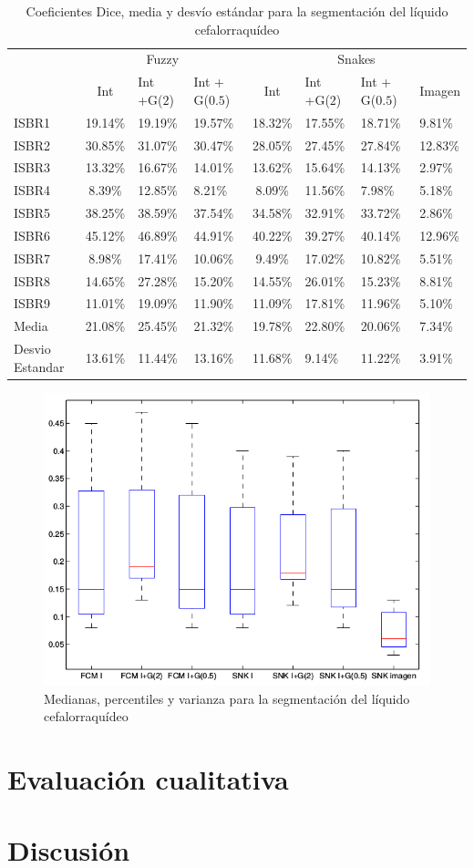 \begin{table}[h]
	\centering
	\begin{tabular}{l|cll|clll}
		& \multicolumn{3}{c|}{Fuzzy} & \multicolumn{4}{c}{Snakes} \\ \cline{2-8} 
		& Int & Int +G($2$) & Int + G($0.5$) & Int & Int +G($2$) & Int + G($0.5$) & Imagen \\ \hline
		ISBR1 & 19.14\% & 19.19\% & 19.57\% & 18.32\% & 17.55\% & 18.71\% & 9.81\% \\
		ISBR2 & 30.85\% & 31.07\% & 30.47\% & 28.05\% & 27.45\% & 27.84\% & 12.83\% \\
		ISBR3 & 13.32\% & 16.67\% & 14.01\% & 13.62\% & 15.64\% & 14.13\% & 2.97\% \\
		ISBR4 & 8.39\% & 12.85\% & 8.21\% & 8.09\% & 11.56\% & 7.98\% & 5.18\% \\
		ISBR5 & 38.25\% & 38.59\% & 37.54\% & 34.58\% & 32.91\% & 33.72\% & 2.86\% \\
		ISBR6 & 45.12\% & 46.89\% & 44.91\% & 40.22\% & 39.27\% & 40.14\% & 12.96\% \\
		ISBR7 & 8.98\% & 17.41\% & 10.06\% & 9.49\% & 17.02\% & 10.82\% & 5.51\% \\
		ISBR8 & 14.65\% & 27.28\% & 15.20\% & 14.55\% & 26.01\% & 15.23\% & 8.81\% \\
		ISBR9 & 11.01\% & 19.09\% & 11.90\% & 11.09\% & 17.81\% & 11.96\% & 5.10\% \\ \hline
		Media & 21.08\% & 25.45\% & 21.32\% & 19.78\% & 22.80\% & 20.06\% & 7.34\% \\ \hline
		Desvio Estandar & 13.61\% & 11.44\% & 13.16\% & 11.68\% & 9.14\% & 11.22\% & 3.91\%
	\end{tabular}
	\caption{Coeficientes Dice, media y desvío estándar para la segmentación del líquido cefalorraquídeo}
	\label{table:resultados_liquido}
\end{table}

\begin{figure}[H]
	\centering
	\includegraphics[scale=0.5]{images/BoxPlotLC.png}
	\caption{Medianas, percentiles y varianza para la segmentación del líquido cefalorraquídeo}
	\label{fig:boxplotLC}
\end{figure}


\section{Evaluación cualitativa}\label{section:evaluacion_cualitativa}
\section{Discusión}\label{section:discusion}